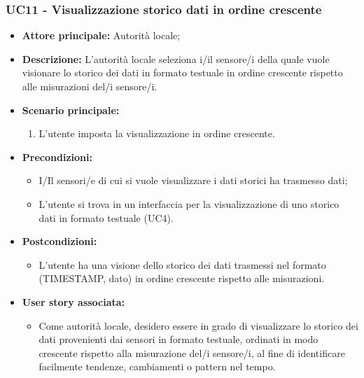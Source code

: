 \subsubsection{UC11 - Visualizzazione storico dati in ordine crescente}
\begin{itemize}
    \item \textbf{Attore principale:} Autorità locale;
    \item \textbf{Descrizione:} L’autorità locale seleziona i/il sensore/i della quale vuole visionare lo storico dei dati in formato testuale in ordine crescente rispetto alle misurazioni del/i sensore/i.
    \item \textbf{Scenario principale:}
          \begin{enumerate}
              \item L'utente imposta la visualizzazione in ordine crescente.
          \end{enumerate}
    \item \textbf{Precondizioni:}
          \begin{itemize}
              \item  I/Il sensori/e di cui si vuole visualizzare i dati storici ha trasmesso dati;
              \item  L'utente si trova in un interfaccia per la visualizzazione di uno storico dati in formato testuale (UC4).
          \end{itemize}
    \item \textbf{Postcondizioni:}
          \begin{itemize}
              \item  L'utente ha una visione dello storico dei dati trasmessi nel formato (TIMESTAMP, dato) in ordine crescente rispetto alle misurazioni.
          \end{itemize}
    \item \textbf{User story associata:}
          \begin{itemize}
              \item Come autorità locale, desidero essere in grado di visualizzare lo storico dei dati provenienti dai sensori in formato testuale, ordinati in modo crescente rispetto alla misurazione del/i sensore/i, al fine di identificare facilmente tendenze, cambiamenti o pattern nel tempo.
          \end{itemize}
\end{itemize}